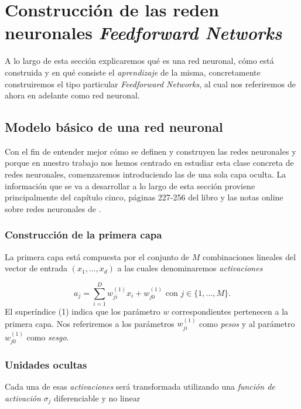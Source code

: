 %
\section{Construcción de las reden neuronales \textit{Feedforward Networks}}

A lo largo de esta sección  explicaremos qué es una red neuronal, cómo está construida y en qué consiste el \textit{aprendizaje} de la misma, concretamente
construiremos el tipo particular \textit{Feedforward Networks}, al cual nos referiremos de ahora
en adelante como red neuronal.

\subsection{Modelo básico de una red neuronal} \label{rrnn:modelo_simple_rrnn}  

Con el fin de entender mejor cómo se definen y construyen las redes neuronales y porque en nuestro trabajo nos hemos centrado en estudiar
esta clase concreta de redes neuronales,
comenzaremos 
introduciendo las de una sola capa oculta. 
La información que se va a desarrollar a lo largo de esta 
sección proviene principalmente del capítulo cinco, páginas 227-256 del libro \cite{BishopPaterRecognition} y las notas online sobre redes neuronales de \cite{MostafaLearningFromData}.


\subsubsection*{Construcción de la primera capa}
La primera capa está compuesta por el conjunto de $M$ combinaciones
lineales del vector de entrada $(x_1, \ldots, x_d)$
a las cuales denominaremos \textit{activaciones}

\begin{equation}
    a_j = \sum_{i=1}^D w_{ji}^{(1)} x_i + w_{j0}^{(1)}
    \text{ con } j \in \{1, \ldots, M \}.
\end{equation}
El superíndice (1) indica que los parámetro $w$ correspondientes pertenecen a la primera capa. 
Nos referiremos a los  parámetros $w_{ji}^{(1)}$ como 
\textit{pesos} y al parámetro $w_{j0}^{(1)}$ como 
\textit{sesgo}.  

\subsubsection*{Unidades ocultas}
Cada una de esas \textit{activaciones} será transformada
utilizando una \textit{función de activación} $\sigma_j$ 
diferenciable y no linear

